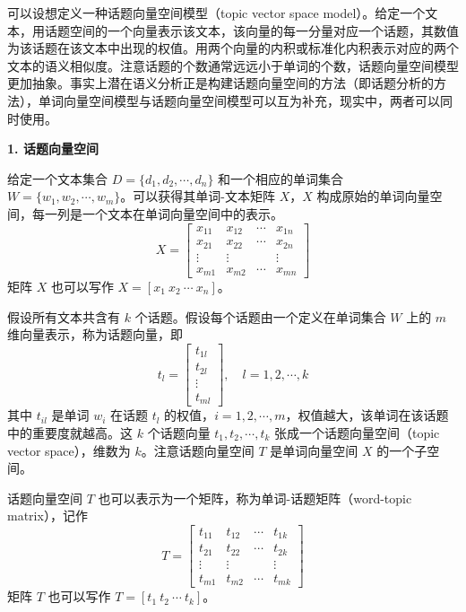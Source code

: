 \documentclass[UTF8, 12pt, fontset=fandol, oneside]{ctexart}
\begin{document}
可以设想定义一种话题向量空间模型（topic vector space model）。给定一个文本，用话题空间的一个向量表示该文本，该向量的每一分量对应一个话题，其数值为该话题在该文本中出现的权值。用两个向量的内积或标准化内积表示对应的两个文本的语义相似度。注意话题的个数通常远远小于单词的个数，话题向量空间模型更加抽象。事实上潜在语义分析正是构建话题向量空间的方法（即话题分析的方法），单词向量空间模型与话题向量空间模型可以互为补充，现实中，两者可以同时使用。

\noindent\textbf{1. 话题向量空间}

给定一个文本集合 $D=\{d_1,d_2,\cdots,d_n\}$ 和一个相应的单词集合 $W=\{w_1,w_2,\cdots,w_m\}$。可以获得其单词-文本矩阵 $X$，$X$ 构成原始的单词向量空间，每一列是一个文本在单词向量空间中的表示。
\begin{equation}
X=
\begin{bmatrix}
x_{11} & x_{12} & \cdots & x_{1n}\\
x_{21} & x_{22} & \cdots & x_{2n}\\
\vdots & \vdots & & \vdots\\
x_{m1} & x_{m2} & \cdots & x_{mn}
\end{bmatrix}
\tag{17.5}
\end{equation}
矩阵 $X$ 也可以写作 $X=[x_1\ x_2\ \cdots\ x_n]$。

假设所有文本共含有 $k$ 个话题。假设每个话题由一个定义在单词集合 $W$ 上的 $m$ 维向量表示，称为话题向量，即
\begin{equation}
t_l=
\begin{bmatrix}
t_{1l}\\
t_{2l}\\
\vdots\\
t_{ml}
\end{bmatrix},
\quad l=1,2,\cdots,k
\tag{17.6}
\end{equation}
其中 $t_{il}$ 是单词 $w_i$ 在话题 $t_l$ 的权值，$i=1,2,\cdots,m$，权值越大，该单词在该话题中的重要度就越高。这 $k$ 个话题向量 $t_1,t_2,\cdots,t_k$ 张成一个话题向量空间（topic vector space），维数为 $k$。注意话题向量空间 $T$ 是单词向量空间 $X$ 的一个子空间。

话题向量空间 $T$ 也可以表示为一个矩阵，称为单词-话题矩阵（word-topic matrix），记作
\begin{equation}
T=
\begin{bmatrix}
t_{11} & t_{12} & \cdots & t_{1k}\\
t_{21} & t_{22} & \cdots & t_{2k}\\
\vdots & \vdots & & \vdots\\
t_{m1} & t_{m2} & \cdots & t_{mk}
\end{bmatrix}
\tag{17.7}
\end{equation}
矩阵 $T$ 也可以写作 $T=[t_1\ t_2\ \cdots\ t_k]$。
\end{document}
